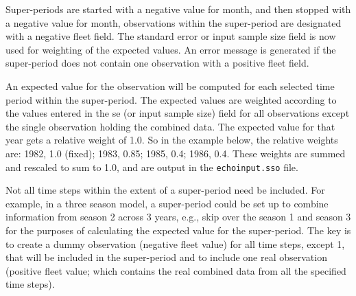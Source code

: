 Super-periods are started with a negative value for month, and then stopped with a negative value for month, observations within the super-period are designated with a negative fleet field. The standard error or input sample size field is now used for weighting of the expected values. An error message is generated if the super-period does not contain one observation with a positive fleet field.

An expected value for the observation will be computed for each selected time period within the super-period. The expected values are weighted according to the values entered in the \gls{se} (or input sample size) field for all observations except the single observation holding the combined data. The expected value for that year gets a relative weight of 1.0. So in the example below, the relative weights are: 1982, 1.0 (fixed); 1983, 0.85; 1985, 0.4; 1986, 0.4. These weights are summed and rescaled to sum to 1.0, and are output in the \texttt{echoinput.sso} file.

Not all time steps within the extent of a super-period need be included. For example, in a three season model, a super-period could be set up to combine information from season 2 across 3 years, e.g., skip over the season 1 and season 3 for the purposes of calculating the expected value for the super-period. The key is to create a dummy observation (negative fleet value) for all time steps, except 1, that will be included in the super-period and to include one real observation (positive fleet value; which contains the real combined data from all the specified time steps).


